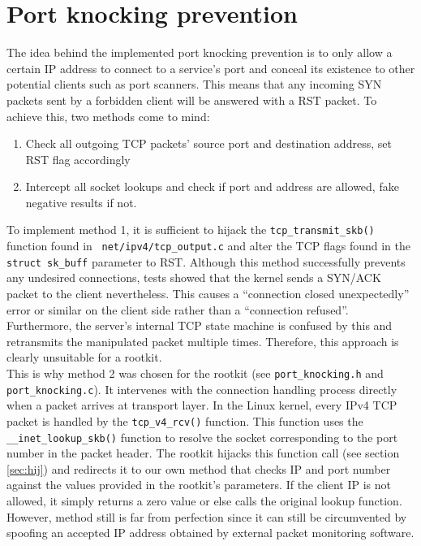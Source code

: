\section{Port knocking prevention}
The idea behind the implemented port knocking prevention is to only allow a 
certain IP address to connect to a service's port and conceal its existence to 
other potential clients such as port scanners. 
This means that any incoming SYN packets sent by a forbidden client will be 
answered with a RST packet. To achieve this,
two methods come to mind:
\begin{enumerate}
 \item Check all outgoing TCP packets' source port and destination address, set 
RST flag accordingly
 \item Intercept all socket lookups and check if port and address are allowed, 
fake negative results if not.
\end{enumerate}
To implement method 1, it is sufficient to hijack the 
\verb+tcp_transmit_skb()+ function found in ~\texttt{net/ipv4/tcp\_output.c} 
and alter the TCP flags found in the \verb+struct sk_buff+
parameter to RST. Although this method successfully prevents any undesired 
connections, tests showed that the kernel sends a SYN/ACK
packet to the client nevertheless. This causes a ``connection closed 
unexpectedly'' error or similar on the client side rather than a
``connection refused''. Furthermore, the server's internal TCP state machine is 
confused by this and retransmits the manipulated packet
multiple times. Therefore, this approach is clearly unsuitable for a rootkit. 
\\
This is why method 2 was chosen for the rootkit (see \verb+port_knocking.h+ and \verb+port_knocking.c+). It intervenes with the 
connection handling process directly when a packet arrives at transport layer.
In the Linux kernel, every IPv4 TCP packet is handled by the 
\texttt{tcp\_v4\_rcv()} function. This 
function uses the \texttt{\_\_inet\_lookup\_skb()} function to resolve the 
socket 
corresponding to the port number in the packet header. The rootkit hijacks this 
function call (see section \ref{sec:hij}) and
redirects it to our own method that checks IP and port number against the values 
provided in the rootkit's parameters. If the client IP
is not allowed, it simply returns a zero value or else calls the original 
lookup function.\\
However, method still is far from perfection since it can still be circumvented 
by spoofing an accepted IP address obtained by external packet monitoring 
software.
